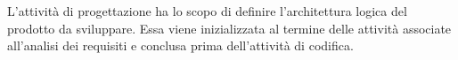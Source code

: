 L'attivit\`{a} di progettazione ha lo scopo di definire l'architettura logica del prodotto da sviluppare. Essa viene inizializzata al termine delle attivit\`{a} associate all'analisi dei requisiti e conclusa prima dell'attivit\`{a} di codifica. 